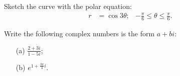 \begin{problem}
Sketch the curve with the polar equation:
\[
\begin{aligned}
r&=\cos 3\theta;&-\frac{\pi}{6}\leq\theta\leq\frac{\pi}{6}.
\end{aligned}
\]
\end{problem}
\bigskip
\begin{problem}
Write the following complex numbers is the form $a+bi$:
\begin{itemize}
\item[(a)] $\displaystyle\frac{2+3i}{1-5i}$;
\item[(b)] $\displaystyle e^{1+\tfrac{3\pi}{4}i}$.
\end{itemize}
\end{problem}
